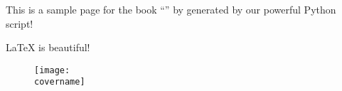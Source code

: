 \documentclass[a4paper,12pt]{report}
\begin{document}
\centering\Huge\textbf{\booktitle}

\vspace{3cm}

\large
This is a sample page for the book ``\booktitle'' by \textit{\bookauthor}
generated by our powerful Python script!

\vspace{0.5cm}

\LaTeX{} is beautiful!

\begin{figure}[!b]
	\centering
	\texttt{[image: \\covername]}
\end{figure}
\end{document}

